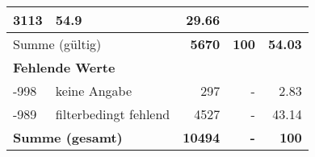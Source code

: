 \begin{longtable}{lXrrr}
       \num{3113} &
       \num[round-mode=places,round-precision=2]{54.9} &
         \num[round-mode=places,round-precision=2]{29.66} \\
     \midrule
     \multicolumn{2}{l}{Summe (gültig)} &
       \textbf{\num{5670}} &
     \textbf{\num{100}} &
       \textbf{\num[round-mode=places,round-precision=2]{54.03}} \\
     \multicolumn{5}{l}{\textbf{Fehlende Werte}}\\
       -998 &
       keine Angabe &
         \num{297} &
        - &
         \num[round-mode=places,round-precision=2]{2.83} \\
       -989 &
       filterbedingt fehlend &
         \num{4527} &
        - &
         \num[round-mode=places,round-precision=2]{43.14} \\
     \midrule
     \multicolumn{2}{l}{\textbf{Summe (gesamt)}} &
          \textbf{\num{10494}} &
        \textbf{-} &
        \textbf{\num{100}} \\
     \bottomrule
     \end{longtable}
     

